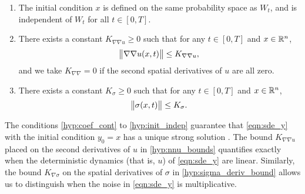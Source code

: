 \begin{hypo}
\begin{enumerate}[label=(H.\arabic{*}), ref=H.\arabic{*}]
		\item\label{hyp:init_indep} The initial condition \(x\) is defined on the same probability space as \(W_t\), and is independent of \(W_t\) for all \(t \in [0,T]\).

		\item\label{hyp:nnu_bounds} There exists a constant \(K_{\nabla\nabla u} \geq 0\) such that for any \(t \in [0,T]\) and \(x \in \mathbb{R}^n\),
		\[
			\norm{\nabla \nabla u(x,t)} \leq K_{\nabla\nabla u},
		\]
		and we take \(K_{\nabla\nabla} = 0\) if the second spatial derivatives of \(u\) are all zero.

		\item\label{hyp:sigma_bounds} There exists a constant \(K_\sigma \geq 0\) such that for any \(t \in [0,T]\) and \(x \in \mathbb{R}^n\),
		\begin{equation*}
			\norm{\sigma(x,t)} \leq K_{\sigma}.
		\end{equation*}

	\end{enumerate}
\end{hypo}
The conditions \ref{hyp:coef_cont} to \ref{hyp:init_indep} guarantee that \cref{eqn:sde_y} with the initial condition \(y_0 = x\) has a unique strong solution \citep{KallianpurSundar_2014_StochasticAnalysisDiffusion}.
The bound \(K_{\nabla\nabla u}\) placed on the second derivatives of \(u\) in \ref{hyp:nnu_bounds} quantifies exactly when the deterministic dynamics (that is, \(u\)) of \cref{eqn:sde_y} are linear.
Similarly, the bound \(K_{\nabla\sigma}\) on the spatial derivatives of \(\sigma\) in \ref{hyp:sigma_deriv_bound} allows us to distinguish when the noise in \cref{eqn:sde_y} is multiplicative.

